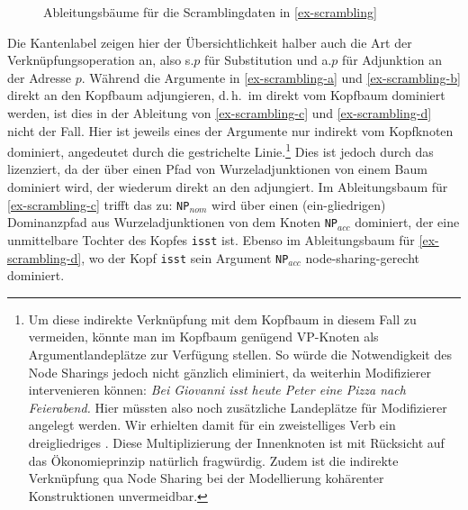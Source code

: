 \begin{figure}[t]
\begin{center}
\end{center}
\caption{\label{fig-ttmctag-ableitung}Ableitungsbäume für die Scramblingdaten in \ref{ex-scrambling}}
\end{figure}
Die Kantenlabel zeigen hier der Übersichtlichkeit halber auch die Art der Verknüpfungsoperation an, also {\sc s}.$p$ für Substitution und {\sc a}.$p$ für Adjunktion an der Adresse $p$. Während die Argumente in \ref{ex-scrambling-a} und \ref{ex-scrambling-b} direkt an den Kopfbaum adjungieren, d.\,h.\ im  direkt vom Kopfbaum dominiert werden, ist dies in der Ableitung von \ref{ex-scrambling-c} und \ref{ex-scrambling-d} nicht der Fall. Hier ist jeweils eines der Argumente nur indirekt vom Kopfknoten dominiert, angedeutet durch die gestrichelte Linie.\footnote{Um diese indirekte Verknüpfung mit dem Kopfbaum in diesem Fall zu vermeiden, könnte man im Kopfbaum genügend VP-Knoten als Argumentlandeplätze zur Verfügung stellen. So würde die Notwendigkeit des Node Sharings jedoch nicht gänzlich eliminiert, da weiterhin Modifizierer intervenieren können: {\it Bei Giovanni isst heute Peter eine Pizza nach Feierabend.} Hier müssten also noch zusätzliche Landeplätze für Modifizierer angelegt werden. Wir erhielten damit für ein zweistelliges Verb ein dreigliedriges . Diese Multiplizierung der Innenknoten ist mit Rücksicht auf das Ökonomieprinzip natürlich fragwürdig. Zudem ist die indirekte Verknüpfung qua Node Sharing bei der Modellierung kohärenter Konstruktionen unvermeidbar.} Dies ist jedoch durch das  lizenziert, da der  über einen Pfad von Wurzeladjunktionen von einem Baum dominiert wird, der wiederum direkt an den  adjungiert. Im Ableitungsbaum für \ref{ex-scrambling-c} trifft das zu: {\tt NP$_{nom}$} wird über einen (ein-gliedrigen) Dominanzpfad aus Wurzeladjunktionen von dem Knoten {\tt NP$_{acc}$} dominiert, der eine unmittelbare Tochter des Kopfes {\tt isst} ist. Ebenso im Ableitungsbaum für \ref{ex-scrambling-d}, wo der Kopf {\tt isst} sein Argument {\tt NP$_{acc}$} node-sharing-gerecht dominiert.

